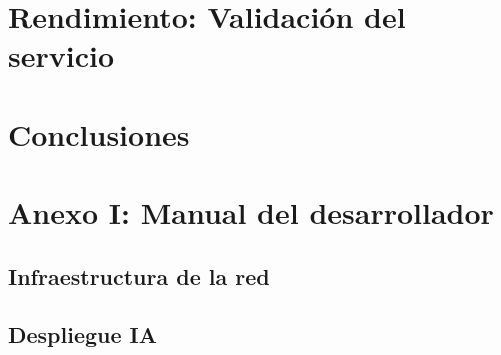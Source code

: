 \documentclass[10pt,a4paper,titlepage]{report}
\begin{document}
\chapter{Rendimiento: Validación del servicio}
	
	
\chapter{Conclusiones}
	
	
\chapter{Anexo I: Manual del desarrollador}
	\section{Infraestructura de la red}
		
	
	\section{Despliegue IA}
		
		
\end{document}
